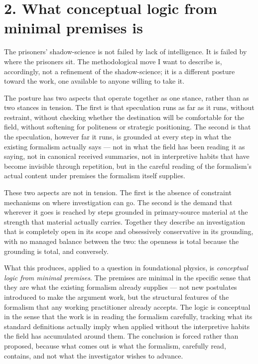 \documentclass[11pt,a4paper]{article}
\begin{document}
\section*{2. What conceptual logic from minimal premises is}

The prisoners' shadow-science is not failed by lack of intelligence. It is failed by where the prisoners sit. The methodological move I want to describe is, accordingly, not a refinement of the shadow-science; it is a different posture toward the work, one available to anyone willing to take it.

The posture has two aspects that operate together as one stance, rather than as two stances in tension. The first is that speculation runs as far as it runs, without restraint, without checking whether the destination will be comfortable for the field, without softening for politeness or strategic positioning. The second is that the speculation, however far it runs, is grounded at every step in what the existing formalism actually says --- not in what the field has been reading it as saying, not in canonical received summaries, not in interpretive habits that have become invisible through repetition, but in the careful reading of the formalism's actual content under premises the formalism itself supplies.

These two aspects are not in tension. The first is the absence of constraint mechanisms on where investigation can go. The second is the demand that wherever it goes is reached by steps grounded in primary-source material at the strength that material actually carries. Together they describe an investigation that is completely open in its scope and obsessively conservative in its grounding, with no managed balance between the two: the openness is total because the grounding is total, and conversely.

What this produces, applied to a question in foundational physics, is \emph{conceptual logic from minimal premises}. The premises are minimal in the specific sense that they are what the existing formalism already supplies --- not new postulates introduced to make the argument work, but the structural features of the formalism that any working practitioner already accepts. The logic is conceptual in the sense that the work is in reading the formalism carefully, tracking what its standard definitions actually imply when applied without the interpretive habits the field has accumulated around them. The conclusion is forced rather than proposed, because what comes out is what the formalism, carefully read, contains, and not what the investigator wishes to advance.
\end{document}
